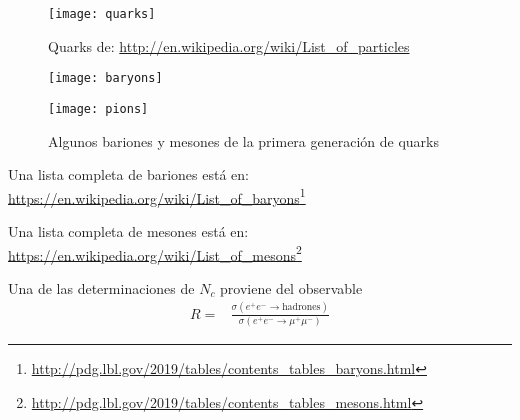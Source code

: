 \begin{frame}
\begin{figure}
  \centering
  \texttt{[image: quarks]}
  \caption{Quarks de: \url{http://en.wikipedia.org/wiki/List_of_particles}}
  \label{tab:quarks}
\end{figure}
\end{frame}
\begin{frame}
\begin{figure}
  \centering
  \texttt{[image: baryons]}
  
  \texttt{[image: pions]}
  \caption{Algunos bariones y mesones de la primera generación de quarks}
  \label{tab:baryonsmesons}
\end{figure}

Una lista completa de bariones está en: \url{https://en.wikipedia.org/wiki/List_of_baryons}\footnote{\url{http://pdg.lbl.gov/2019/tables/contents_tables_baryons.html}}

Una lista completa de mesones está en: \url{https://en.wikipedia.org/wiki/List_of_mesons}\footnote{\url{http://pdg.lbl.gov/2019/tables/contents_tables_mesons.html}}


\end{frame}





Una de las determinaciones de $N_c$ proviene del observable
\begin{align}
  R=&\frac{\sigma(e^+e^-\to\text{hadrones})}{\sigma(e^+e^-\to\mu^+\mu^-)}
\end{align}

